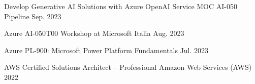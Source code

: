 

\begin{cvhonors}

  \cvhonor
    {Develop Generative AI Solutions with Azure OpenAI Service MOC AI-050} %
    {Pipeline} %
    {} %
    {Sep. 2023} %

  \cvhonor
    {Azure AI-050T00} %
    {Workshop at Microsoft Italia} %
    {} %
    {Aug. 2023} %

  \cvhonor
    {Azure PL-900: Microsoft Power Platform Fundamentals} %
    {} %
    {} %
    {Jul. 2023} %

  \cvhonor
    {AWS Certified Solutions Architect – Professional} %
    {Amazon Web Services (AWS)} %
    {} %
    {2022} %


\end{cvhonors}

